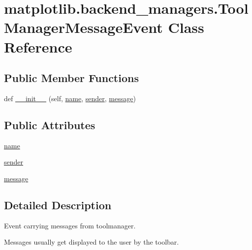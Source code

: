 \hypertarget{classmatplotlib_1_1backend__managers_1_1ToolManagerMessageEvent}{}\section{matplotlib.\+backend\+\_\+managers.\+Tool\+Manager\+Message\+Event Class Reference}
\label{classmatplotlib_1_1backend__managers_1_1ToolManagerMessageEvent}
\subsection*{Public Member Functions}
\begin{DoxyCompactItemize}
\item 
def \hyperlink{classmatplotlib_1_1backend__managers_1_1ToolManagerMessageEvent_a2dd981f864341ef8c8dcfdfb44b36c96}{\+\_\+\+\_\+init\+\_\+\+\_\+} (self, \hyperlink{classmatplotlib_1_1backend__managers_1_1ToolManagerMessageEvent_a56e31a927c82d3d39dfc31a4ccede046}{name}, \hyperlink{classmatplotlib_1_1backend__managers_1_1ToolManagerMessageEvent_a1ed1f59fd7bc8e9deb72c0aa47e66e2c}{sender}, \hyperlink{classmatplotlib_1_1backend__managers_1_1ToolManagerMessageEvent_a667afde54d6aaf81fc5fc238f42d88aa}{message})
\end{DoxyCompactItemize}
\subsection*{Public Attributes}
\begin{DoxyCompactItemize}
\item 
\hyperlink{classmatplotlib_1_1backend__managers_1_1ToolManagerMessageEvent_a56e31a927c82d3d39dfc31a4ccede046}{name}
\item 
\hyperlink{classmatplotlib_1_1backend__managers_1_1ToolManagerMessageEvent_a1ed1f59fd7bc8e9deb72c0aa47e66e2c}{sender}
\item 
\hyperlink{classmatplotlib_1_1backend__managers_1_1ToolManagerMessageEvent_a667afde54d6aaf81fc5fc238f42d88aa}{message}
\end{DoxyCompactItemize}


\subsection{Detailed Description}
\begin{DoxyVerb}Event carrying messages from toolmanager.

Messages usually get displayed to the user by the toolbar.
\end{DoxyVerb}
 

